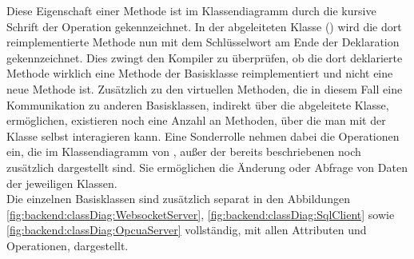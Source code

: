 Diese Eigenschaft einer Methode ist im Klassendiagramm durch die kursive Schrift der Operation gekennzeichnet.
In der abgeleiteten Klasse () wird die dort reimplementierte Methode nun mit dem Schlüsselwort  am Ende der Deklaration gekennzeichnet.
Dies zwingt den Kompiler zu überprüfen, ob die dort deklarierte Methode wirklich eine Methode der Basisklasse reimplementiert und nicht eine neue Methode ist.
Zusätzlich zu den virtuellen Methoden, die in diesem Fall eine Kommunikation zu anderen Basisklassen, indirekt über die abgeleitete Klasse, ermöglichen, existieren noch eine Anzahl an Methoden, 
über die man mit der Klasse selbst interagieren kann.
Eine Sonderrolle nehmen dabei die Operationen ein, die im Klassendiagramm von , außer der bereits beschriebenen noch zusätzlich dargestellt sind.
Sie ermöglichen die Änderung oder Abfrage von Daten der jeweiligen Klassen.\\
Die einzelnen Basisklassen sind zusätzlich separat in den Abbildungen 
\ref{fig:backend:classDiag:WebsocketServer}, \ref{fig:backend:classDiag:SqlClient} sowie \ref{fig:backend:classDiag:OpcuaServer} 
vollständig, mit allen Attributen und Operationen, dargestellt.


